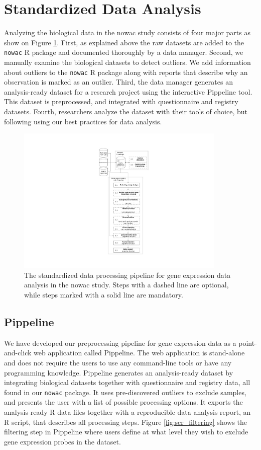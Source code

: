 \section{Standardized Data Analysis}
Analyzing the biological data in the \gls{nowac} study consists of four major
parts as show on Figure \ref{fig:uit_pippeline}. First, as explained above the
raw datasets are added to the \texttt{nowac} R package and documented thoroughly
by a data manager.  Second, we manually examine the biological datasets to
detect outliers. We add information about outliers to the \texttt{nowac} R
package along with reports that describe why an observation is marked as an
outlier.  Third, the data manager generates an analysis-ready dataset for a
research project using the interactive Pippeline tool. This dataset is
preprocessed, and integrated with questionnaire and registry datasets. Fourth,
researchers analyze the dataset with their tools of choice, but following using
our best practices for data analysis.

\begin{figure}
    \centering
    \includegraphics[width=10cm]{figures/uit_pippeline_rm_refs.pdf}
    \caption[Standardized data processing pipeline]{The standardized data
    processing pipeline for gene expression data analysis in the \gls{nowac}
    study. Steps with a dashed line are optional, while steps marked with a
    solid line are mandatory.}
    \label{fig:uit_pippeline}
\end{figure}


\subsection{Pippeline} 
We have developed our preprocessing pipeline for gene expression data as a
point-and-click web application called Pippeline. The web application is
stand-alone and does not require the users to use any command-line tools or have
any programming knowledge. Pippeline generates an analysis-ready dataset by
integrating biological datasets together with questionnaire and registry data,
all found in our \texttt{nowac} package. It uses pre-discovered outliers to
exclude samples, and presents the user with a list of possible processing
options. It exports the analysis-ready R data files together with a reproducible
data analysis report, an R script, that describes all processing steps.  Figure
\ref{fig:scr_filtering} shows the filtering step in Pippeline where users define
at what level they wish to exclude gene expression probes in the dataset. 

